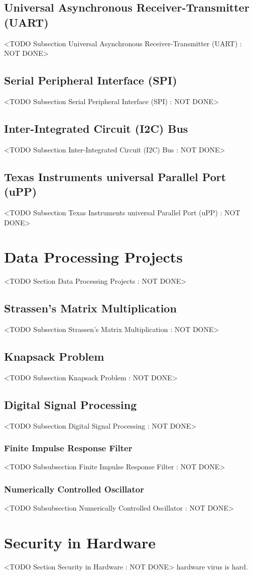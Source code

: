 \subsection{Universal Asynchronous Receiver-Transmitter (UART)}
	<TODO Subsection Universal Asynchronous Receiver-Transmitter (UART) : NOT DONE>

\subsection{Serial Peripheral Interface (SPI)}
	<TODO Subsection Serial Peripheral Interface (SPI) : NOT DONE>

\subsection{Inter-Integrated Circuit (I2C) Bus}
	<TODO Subsection Inter-Integrated Circuit (I2C) Bus : NOT DONE>

\subsection{Texas Instruments universal Parallel Port (uPP)}
	<TODO Subsection Texas Instruments universal Parallel Port (uPP) : NOT DONE>

\section{Data Processing Projects}
	<TODO Section Data Processing Projects : NOT DONE>

\subsection{Strassen's Matrix Multiplication}
	<TODO Subsection Strassen's Matrix Multiplication : NOT DONE>

\subsection{Knapsack Problem}
	<TODO Subsection Knapsack Problem : NOT DONE>

\subsection{Digital Signal Processing}
	<TODO Subsection Digital Signal Processing : NOT DONE>

\subsubsection{Finite Impulse Response Filter}
	<TODO Subsubsection  Finite Impulse Response Filter : NOT DONE>

\subsubsection{Numerically Controlled Oscillator}
	<TODO Subsubsection  Numerically Controlled Oscillator : NOT DONE>

\section{Security in Hardware}
	<TODO Section Security in Hardware : NOT DONE>
hardware virus is hard. 
